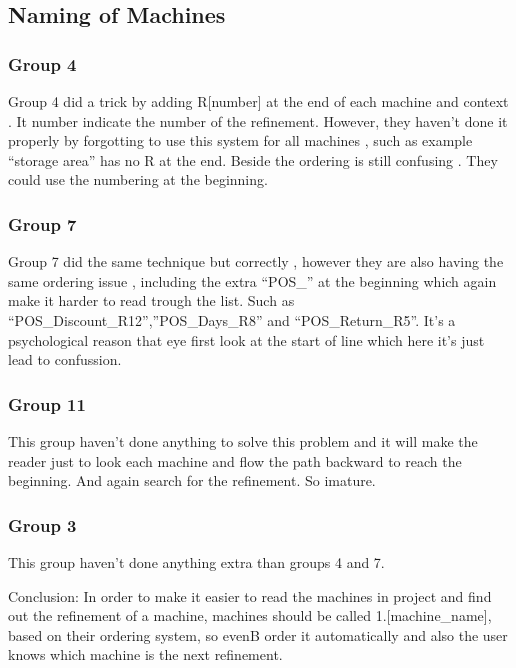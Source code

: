 \subsection{Naming of Machines}
\label{namingofmachines}

\subsubsection{Group 4}
\label{group4}

Group 4 did a trick by adding R[number] at the end of each machine and context . It number indicate the number of the refinement. However, they haven't done it properly by forgotting to use this system for all machines , such as example “storage area” has no R at the end. Beside the ordering is still confusing . They could use the numbering at the beginning.

\subsubsection{Group 7}
\label{group7}

Group 7 did the same technique but correctly , however they are also having the same ordering issue , including the extra “POS\_” at the beginning which again make it harder to read trough the list. Such as “POS\_Discount\_R12”,”POS\_Days\_R8” and “POS\_Return\_R5”. It's a psychological reason that eye first look at the start of line which here it's just lead to confussion.

\subsubsection{Group 11}
\label{group11}

This group haven't done anything to solve this problem and it will make the reader just to look each machine and flow the path backward to reach the beginning. And again search for the refinement. So imature.

\subsubsection{Group 3}
\label{group3}

This group haven't done anything extra than groups 4 and 7.

Conclusion: In order to make it easier to read the machines in project and find out the refinement of a machine, machines should be called 1.[machine\_name], based on their ordering system, so evenB order it automatically and also the user knows which machine is the next refinement. 

